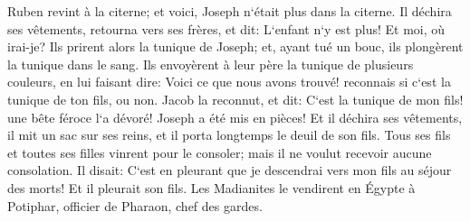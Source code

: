 \verse Ruben revint à la citerne; et voici, Joseph n`était plus dans la citerne. Il déchira ses vêtements, 
\verse retourna vers ses frères, et dit: L`enfant n`y est plus! Et moi, où irai-je? 
\verse Ils prirent alors la tunique de Joseph; et, ayant tué un bouc, ils plongèrent la tunique dans le sang. 
\verse Ils envoyèrent à leur père la tunique de plusieurs couleurs, en lui faisant dire: Voici ce que nous avons trouvé! reconnais si c`est la tunique de ton fils, ou non. 
\verse Jacob la reconnut, et dit: C`est la tunique de mon fils! une bête féroce l`a dévoré! Joseph a été mis en pièces! 
\verse Et il déchira ses vêtements, il mit un sac sur ses reins, et il porta longtemps le deuil de son fils. 
\verse Tous ses fils et toutes ses filles vinrent pour le consoler; mais il ne voulut recevoir aucune consolation. Il disait: C`est en pleurant que je descendrai vers mon fils au séjour des morts! Et il pleurait son fils. 
\verse Les Madianites le vendirent en Égypte à Potiphar, officier de Pharaon, chef des gardes. 

